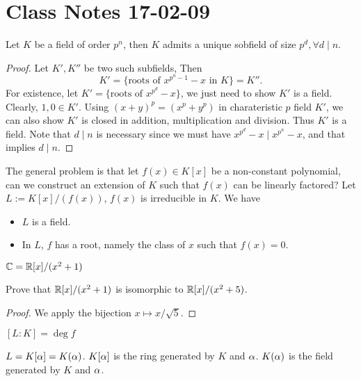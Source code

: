 \section{Class Notes 17-02-09}
\begin{proposition}
	Let $K$ be a field of order $p^n$, then $K$ admits a unique sobfield of size $p^d,\forall d\mid n$.
\end{proposition}
\begin{proof}
	Let $K', K''$ be two such subfields, Then
	$$K'=\{\mbox{roots of $x^{p^n-1}-x$ in $K$}\} = K''.$$For existence, let $K' = \{\mbox{roots of $x^{p^d}-x$}\}$, we just need to show $K'$ is a field. Clearly, $1,0\in K'$. Using $(x+y)^{p} = (x^p+y^p)$ in charateristic $p$ field $K'$, we can also show $K'$ is closed in addition, multiplication and division. Thus $K'$ is a field. Note that $d\mid n$ is necessary since we must have $x^{p^d}-x\mid x^{p^n}-x$, and that implies $d\mid n$.
\end{proof}
The general problem is that let $f(x)\in K[x]$ be a non-constant polynomial, can we construct an extension of $K$ such that $f(x)$ can be linearly factored? Let $L:=K[x]/(f(x))$, $f(x)$ is irreducible in $K$. We have
\begin{theorem}\mbox{}
	\begin{itemize}
		\item $L$ is a field.
		\item In $L$, $f$ has a root, namely the class of $x$ such that $f(x)=0$.
	\end{itemize}
\end{theorem}
\begin{example}
	$\mathbb{C} = \mathbb{R}[x]/(x^2+1)$
\end{example}
\begin{exercise}
	Prove that $\mathbb{R}[x]/(x^2+1)$ is isomorphic to $\mathbb{R}[x]/(x^2+5)$.
\end{exercise}
\begin{proof}
	We apply the bijection $x\mapsto x/\sqrt{5}$.
\end{proof}
\begin{theorem}
	$[L:K] = \deg f$
\end{theorem}
\begin{corollary}
	$L=K[\alpha] = K(\alpha)$. $K[\alpha]$ is the ring generated by $K$ and $\alpha$. $K(\alpha)$ is the field generated by $K$ and $\alpha$.
\end{corollary}


